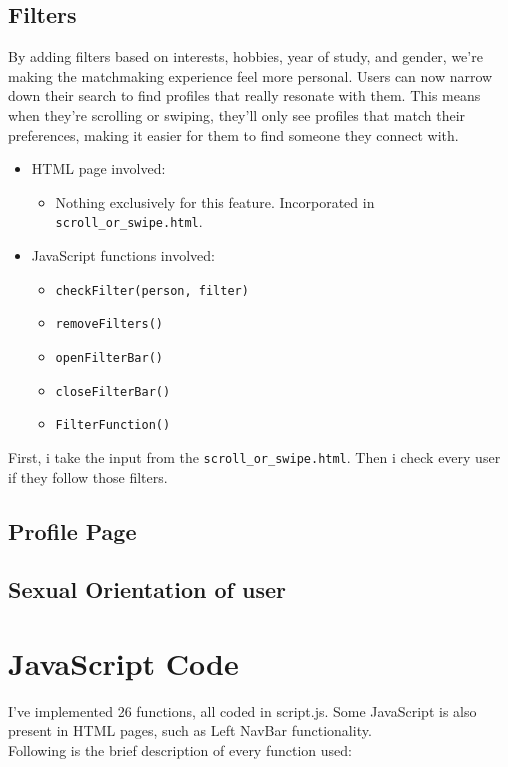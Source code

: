\documentclass[12pt,a4paper]{article}
\begin{document}
\subsection{Filters}
By adding filters based on interests, hobbies, year of study, and gender, we're making the matchmaking experience feel more personal. Users can now narrow down their search to find profiles that really resonate with them. This means when they're scrolling or swiping, they'll only see profiles that match their preferences, making it easier for them to find someone they connect with.
\begin{itemize}
    \item HTML page involved:\begin{itemize}
        \item Nothing exclusively for this feature. Incorporated in \texttt{scroll\_or\_swipe.html}.
    \end{itemize}
    \item JavaScript functions involved: \begin{itemize}
        \item \texttt{checkFilter(person, filter)}
        \item \texttt{removeFilters()}
        \item \texttt{openFilterBar()}
        \item \texttt{closeFilterBar()}
        \item \texttt{FilterFunction()}
    \end{itemize}
\end{itemize}
First, i take the input from the \texttt{scroll\_or\_swipe.html}. Then i check every user if they follow those filters.  
\subsection{Profile Page}
\subsection{Sexual Orientation of user}






\section{JavaScript Code}
I've implemented 26 functions, all coded in script.js. Some JavaScript is also present in HTML pages, such as Left NavBar functionality.
\\
Following is the brief description of every function used:
\end{document}
